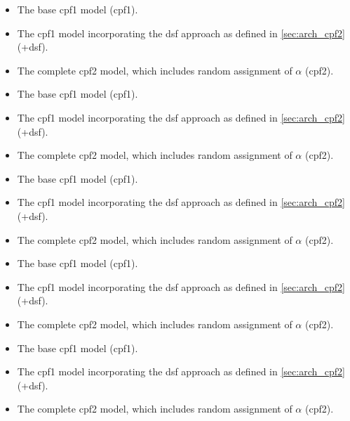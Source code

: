 \begin{itemize}
\item The base \gls{cpf1} model (\gls{cpf1}).
\item The \gls{cpf1} model incorporating the \gls{dsf} approach as defined in \cref{sec:arch_cpf2} (+\gls{dsf}).
\item The complete \gls{cpf2} model, which includes random assignment of $\alpha$ (\gls{cpf2}).
\end{itemize}
\begin{itemize}
\item The base \gls{cpf1} model (\gls{cpf1}).
\item The \gls{cpf1} model incorporating the \gls{dsf} approach as defined in \cref{sec:arch_cpf2} (+\gls{dsf}).
\item The complete \gls{cpf2} model, which includes random assignment of $\alpha$ (\gls{cpf2}).
\end{itemize}
\begin{itemize}
\item The base \gls{cpf1} model (\gls{cpf1}).
\item The \gls{cpf1} model incorporating the \gls{dsf} approach as defined in \cref{sec:arch_cpf2} (+\gls{dsf}).
\item The complete \gls{cpf2} model, which includes random assignment of $\alpha$ (\gls{cpf2}).
\end{itemize}
\begin{frame}[t]
\begin{itemize}
\item The base \gls{cpf1} model (\gls{cpf1}).
\item The \gls{cpf1} model incorporating the \gls{dsf} approach as defined in \cref{sec:arch_cpf2} (+\gls{dsf}).
\item The complete \gls{cpf2} model, which includes random assignment of $\alpha$ (\gls{cpf2}).
\end{itemize}
\end{frame}

\begin{frame}[t]
\begin{itemize}
\item The base \gls{cpf1} model (\gls{cpf1}).
\item The \gls{cpf1} model incorporating the \gls{dsf} approach as defined in \cref{sec:arch_cpf2} (+\gls{dsf}).
\item The complete \gls{cpf2} model, which includes random assignment of $\alpha$ (\gls{cpf2}).
\end{itemize}
\end{frame}

